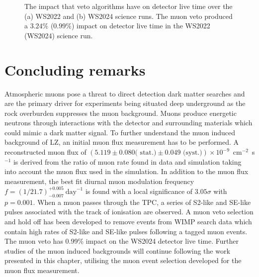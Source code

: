 \begin{figure}[h!]
\begin{subfigure}{0.47\textwidth}
    \caption{}
    \label{fig:WS2024_MuonVetoLivetimeImpact}
\end{subfigure}
\caption[The impact that veto algorithms have on detector live time over the WS2022 and WS2024 science runs.]{The impact that veto algorithms have on detector live time over the (a) WS2022 and (b) WS2024 science runs. The muon veto produced a $3.24\%$ ($0.99\%$) impact on detector live time in the WS2022 (WS2024) science run.}
\label{fig:MuonVetoLivetimeImpact}
\end{figure}

\pagebreak

\section{Concluding remarks}
Atmospheric muons pose a threat to direct detection dark matter searches and are the primary driver for experiments being situated deep underground as the rock overburden suppresses the muon background. Muons produce energetic neutrons through interactions with the detector and surrounding materials which could mimic a dark matter signal. To further understand the muon induced background of LZ, an initial muon flux measurement has to be performed. A reconstructed muon flux of $(5.119 \pm 0.080 \textrm{( stat.)} \pm 0.049 \textrm{ (syst.)})\times10^{-9}$~cm$^{-2}$~s$^{-1}$ is derived from the ratio of muon rate found in data and simulation taking into account the muon flux used in the simulation. In addition to the muon flux measurement, the best fit diurnal muon modulation frequency $f=(1/21.7)^{+0.005}_{-0.007}~\text{day}^{-1}$ is found with a local significance of $3.05\sigma$ with $p=0.001$. When a muon passes through the TPC, a series of S2-like and SE-like pulses associated with the track of ionisation are observed. A muon veto selection and hold off has been developed to remove events from WIMP search data which contain high rates of S2-like and SE-like pulses following a tagged muon events. The muon veto has 0.99\% impact on the WS2024 detector live time. Further studies of the muon induced backgrounds will continue following the work presented in this chapter, utilising the muon event selection developed for the muon flux measurement.